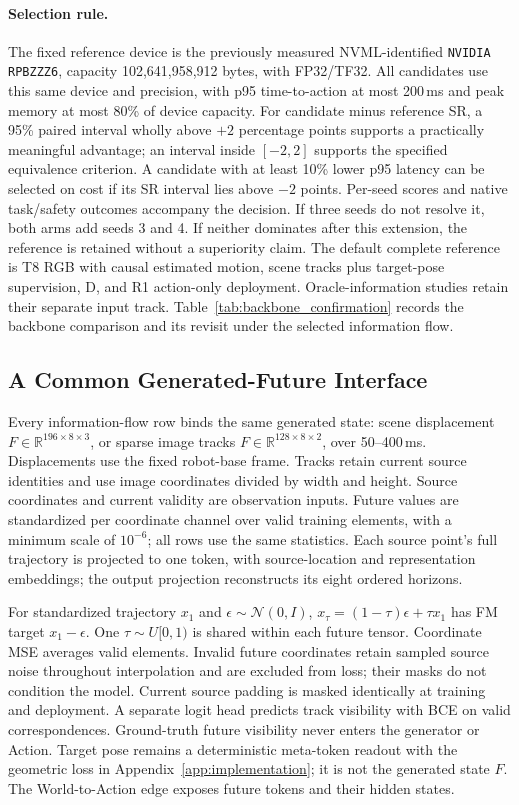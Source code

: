 \paragraph{Selection rule.}
The fixed reference device is the previously measured NVML-identified
\texttt{NVIDIA RPBZZZ6}, capacity 102,641,958,912 bytes, with FP32/TF32.
All candidates use this same device and precision, with p95 time-to-action
at most 200\,ms and peak memory at most 80\% of device capacity. For candidate
minus reference SR, a 95\% paired interval wholly above $+2$ percentage points
supports a practically meaningful advantage; an interval inside $[-2,2]$
supports the specified equivalence criterion. A candidate with at least 10\%
lower p95 latency can be selected on cost if its SR interval lies above
$-2$ points. Per-seed scores and native task/safety outcomes accompany the
decision. If three seeds do not resolve it, both arms add seeds 3 and 4.
If neither dominates after this extension, the reference is retained without
a superiority claim. The default complete reference is T8 RGB with causal
estimated motion, scene tracks plus target-pose supervision, D, and R1
action-only deployment. Oracle-information studies retain their separate
input track. Table~\ref{tab:backbone_confirmation} records the backbone
comparison and its revisit under the selected information flow.



\subsection{A Common Generated-Future Interface}
\label{app:generated_future}
Every information-flow row binds the same generated state: scene
displacement $F\in\mathbb R^{196\times8\times3}$, or sparse image tracks
$F\in\mathbb R^{128\times8\times2}$, over 50--400\,ms. Displacements use the
fixed robot-base frame. Tracks retain current source identities and use
image coordinates divided by width and height. Source coordinates and
current validity are observation inputs. Future values are standardized
per coordinate channel over valid training elements, with a minimum scale
of $10^{-6}$; all rows use the same statistics. Each source point's full
trajectory is projected to one token, with source-location and representation
embeddings; the output projection reconstructs its eight ordered horizons.

For standardized trajectory $x_1$ and $\epsilon\sim\mathcal N(0,I)$,
$x_\tau=(1-\tau)\epsilon+\tau x_1$ has FM target $x_1-\epsilon$.
One $\tau\sim U[0,1)$ is shared within each future tensor. Coordinate MSE
averages valid elements. Invalid future coordinates retain sampled source
noise throughout interpolation and are excluded from loss;
their masks do not condition the model. Current source padding is masked
identically at training and deployment. A separate logit head predicts
track visibility with BCE on valid correspondences. Ground-truth future
visibility never enters the generator or Action. Target pose remains a
deterministic meta-token readout with the geometric loss in
Appendix~\ref{app:implementation}; it is not the generated state $F$.
The World-to-Action edge exposes future tokens and their hidden states.

